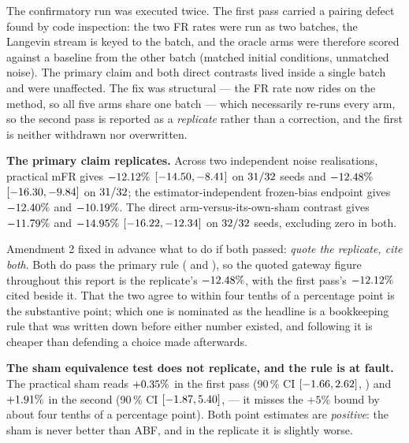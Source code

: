 \begin{remark}
\label{rem:gw_replicate}
The confirmatory run was executed twice. The first pass carried a pairing defect found by code
inspection: the two FR rates were run as two batches, the Langevin stream is keyed to the
batch, and the oracle arms were therefore scored against a baseline from the other batch
(matched initial conditions, unmatched noise). The primary claim and both direct contrasts
lived inside a single batch and were unaffected. The fix was structural --- the FR rate now
rides on the method, so all five arms share one batch --- which necessarily re-runs every arm,
so the second pass is reported as a \emph{replicate} rather than a correction, and the first is
neither withdrawn nor overwritten.

\textbf{The primary claim replicates.} Across two independent noise realisations, practical
mFR gives $-12.12\%$ $[-14.50, -8.41]$ on $31/32$ seeds and
$-12.48\%$ $[-16.30, -9.84]$ on $31/32$; the estimator-independent
frozen-bias endpoint gives $-12.40\%$ and $-10.19\%$. The direct
arm-versus-its-own-sham contrast gives $-11.79\%$ and $-14.95\%$
$[-16.22, -12.34]$ on $32/32$ seeds, excluding zero in both.

Amendment 2 fixed in advance what to do if both passed: \emph{quote the replicate, cite
both}. Both do pass the primary rule (\GwcPrimary{} and \GwrPrimary{}), so the quoted gateway
figure throughout this report is the replicate's $-12.48\%$, with the first pass's
$-12.12\%$ cited beside it. That the two agree to within four tenths of a percentage
point is the substantive point; which one is nominated as the headline is a bookkeeping rule
that was written down before either number existed, and following it is cheaper than
defending a choice made afterwards.

\textbf{The sham equivalence test does not replicate, and the rule is at fault.} The practical
sham reads $+0.35\%$ in the first pass (90\,\% CI $[-1.66, 2.62]$,
\GwcShamTost) and $+1.91\%$ in the second (90\,\% CI
$[-1.87, 5.40]$, \GwrShamTost{} --- it misses the $+5\%$ bound by
about four tenths of a percentage point). Both point estimates are \emph{positive}: the sham is
never better than ABF, and in the replicate it is slightly worse.


\end{remark}
